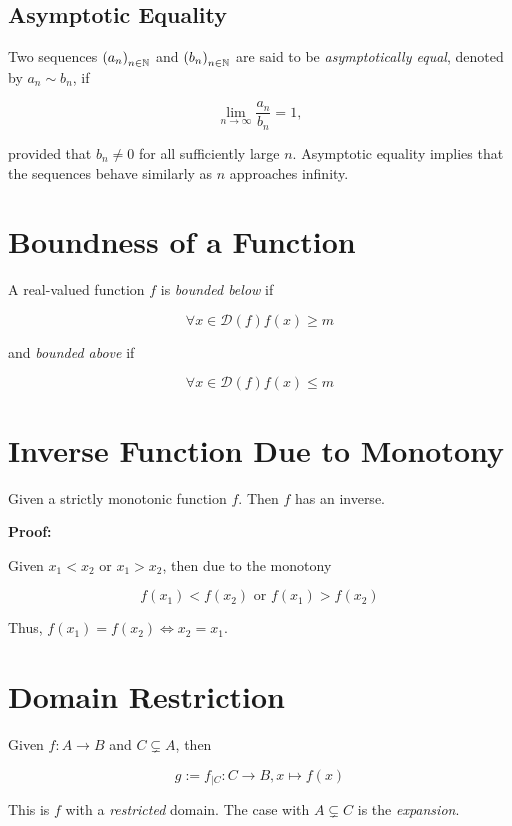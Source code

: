 \subsection{Asymptotic Equality}

Two sequences \({(a_n)}_{n \in \mathbb{N}}\) and \({(b_n)}_{n \in \mathbb{N}}\) are said to be
\emph{asymptotically equal}, denoted by \(a_n \sim b_n\), if

\[
	\lim_{n \to \infty} \frac{a_n}{b_n} = 1,
\]

provided that \(b_n \neq 0\) for all sufficiently large \(n\). Asymptotic equality implies that the sequences behave similarly as \(n\) approaches infinity.

\section{Boundness of a Function}

A real-valued function \(f\) is \emph{bounded below} if

\[
	\forall x \in \mathcal{D}(f) f(x) \ge m
\]

and \emph{bounded above} if

\[
	\forall x \in \mathcal{D}(f) f(x) \le m
\]

\section{Inverse Function Due to Monotony}

Given a strictly monotonic function \(f\). Then \(f\) has an inverse.

\textbf{Proof:}

Given \(x_1 < x_2\) or \(x_1 > x_2\), then due to the monotony

\[
	f(x_1) < f(x_2) \text{ or } f(x_1) > f(x_2)
\]

Thus, \(f(x_1) = f(x_2) \iff x_2 = x_1\).

\QED

\section{Domain Restriction}

Given \(f: A \to B\) and \(C \subsetneq A\), then

\[
	g := f_{\mid C}: C \to B, x \mapsto f(x)
\]

This is \(f\) with a \emph{restricted} domain. The case with \(A \subsetneq C\) is the \emph{expansion}.
